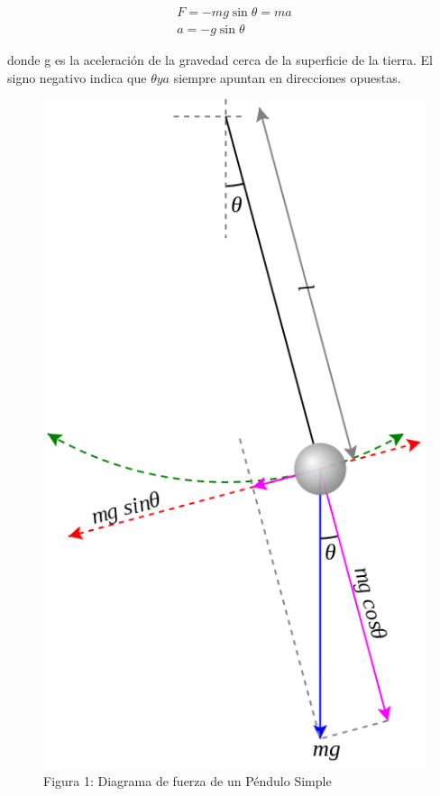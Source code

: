 \documentclass[12pt,letterpaper]{article}
\begin{document}
\begin{eqnarray}
\nonumber F = -mg\sin\theta = ma \\
\nonumber a = -g\sin\theta 
\end{eqnarray}

donde g es la aceleración de la gravedad cerca de la superficie de la tierra. El signo negativo indica que $\theta y a$ siempre apuntan en direcciones opuestas.

\begin{figure}
\begin{center}
\includegraphics[scale=.3]{Pendulum.png}
\caption{Figura 1: Diagrama de fuerza de un Péndulo Simple}
\end{center}

\end{figure}
\end{document}
